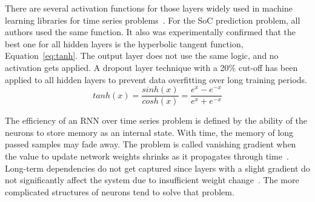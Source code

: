 %
%
There are several activation functions for those layers widely used in machine learning libraries for time series problems~\cite{amidi_cs_2018}.
For the SoC prediction problem, all authors used the same function.
It also was experimentally confirmed that the best one for all hidden layers is the hyperbolic tangent function, Equation~\ref{eq:tanh}.
The output layer does not use the same logic, and no activation gets applied.
A dropout layer technique with a 20\% cut-off has been applied to all hidden layers to prevent data overfitting over long training periods.
\begin{equation}
    tanh(x) = \frac{sinh(x)}{cosh(x)}=\frac{e^x-e^{-x}}{e^x+e^{-x}}
    \label{eq:tanh}
\end{equation}
%
%


%
The efficiency of an RNN over time series problem is defined by the ability of the neurons to store memory as an internal state.
With time, the memory of long passed samples may fade away.
The problem is called vanishing gradient when the value to update network weights shrinks as it propagates through time~\cite{rasifaghihi_predictive_2020}.
Long-term dependencies do not get captured since layers with a slight gradient do not significantly affect the system due to insufficient weight change~\cite{rasifaghihi_predictive_2020,hochreiter_vanishing_1998}.
The more complicated structures of neurons tend to solve that problem.

